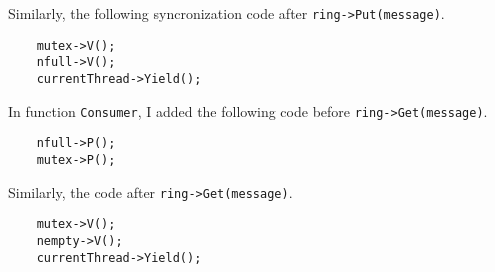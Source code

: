 \documentclass[11pt]{article}
\begin{document}
\begin{question}
\begin{subquestion}
            Similarly, the following syncronization code after {\tt ring->Put(message)}.
            \begin{verbatim}
    mutex->V();
    nfull->V();
    currentThread->Yield();
            \end{verbatim}

        \end{subquestion}
        \begin{subquestion}
        In function {\tt Consumer}, I added the following code before {\tt ring->Get(message)}.
        \begin{verbatim}
    nfull->P();
    mutex->P();
        \end{verbatim}

        Similarly, the code after {\tt ring->Get(message)}.
        \begin{verbatim}
    mutex->V();
    nempty->V();
    currentThread->Yield();
        \end{verbatim}
        \end{subquestion}

    \end{question}
\end{document}
